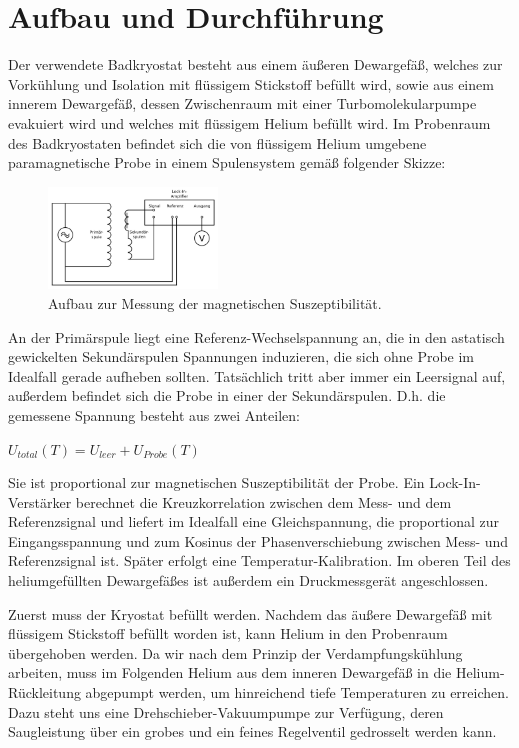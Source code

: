 \documentclass[bigchapter,colorback,accentcolor=tud4b,linedtoc,11pt]{tudreport}
\begin{document}
\chapter{Aufbau und Durchführung}

Der verwendete Badkryostat besteht aus einem äußeren Dewargefäß, welches zur Vorkühlung und Isolation mit flüssigem Stickstoff befüllt wird, sowie aus einem innerem Dewargefäß, dessen Zwischenraum mit einer Turbomolekularpumpe evakuiert wird und welches mit flüssigem Helium befüllt wird. Im Probenraum des Badkryostaten befindet sich die von flüssigem Helium umgebene paramagnetische Probe in einem Spulensystem gemäß folgender Skizze: 

\begin{figure}[h] 
  \centering
     \includegraphics[width=0.4\textwidth]{data/Aufbau.jpg}
  \caption{Aufbau zur Messung der magnetischen Suszeptibilität. \cite{anleitung}}  
  \label{fig:Bild1}
\end{figure}


An der Primärspule liegt eine Referenz-Wechselspannung an, die in den astatisch gewickelten Sekundärspulen Spannungen induzieren, die sich ohne Probe im Idealfall gerade aufheben sollten. Tatsächlich tritt aber immer ein Leersignal auf, außerdem befindet sich die Probe in einer der Sekundärspulen. D.h. die gemessene Spannung besteht aus zwei Anteilen: 
\begin{center}
    $U_{total}(T) = U_{leer} + U_{Probe}(T)$
\end{center}


Sie ist proportional zur magnetischen Suszeptibilität der Probe. Ein Lock-In-Verstärker berechnet die Kreuzkorrelation zwischen dem Mess- und dem Referenzsignal und liefert im Idealfall eine Gleichspannung, die proportional zur Eingangsspannung und zum Kosinus der Phasenverschiebung zwischen Mess- und Referenzsignal ist. Später erfolgt eine Temperatur-Kalibration. Im oberen Teil des heliumgefüllten Dewargefäßes ist außerdem ein Druckmessgerät angeschlossen.

Zuerst muss der Kryostat befüllt werden. Nachdem das äußere Dewargefäß mit flüssigem Stickstoff befüllt worden ist, kann Helium in den Probenraum übergehoben werden. Da wir nach dem Prinzip der Verdampfungskühlung arbeiten, muss im Folgenden Helium aus dem inneren Dewargefäß in die Helium-Rückleitung abgepumpt werden, um hinreichend tiefe Temperaturen zu erreichen. Dazu steht uns eine Drehschieber-Vakuumpumpe zur Verfügung, deren Saugleistung über ein grobes und ein feines Regelventil gedrosselt werden kann. 
\end{document}
